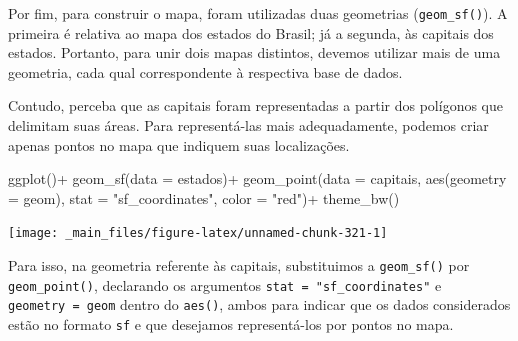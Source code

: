 \documentclass[
  brazilian,
]{book}
\newenvironment{Shaded}{\begin{snugshade}}{\end{snugshade}}
\newcommand{\AttributeTok}[1]{\textcolor[rgb]{0.77,0.63,0.00}{#1}}
\newcommand{\FunctionTok}[1]{\textcolor[rgb]{0.00,0.00,0.00}{#1}}
\newcommand{\NormalTok}[1]{#1}
\newcommand{\SpecialCharTok}[1]{\textcolor[rgb]{0.00,0.00,0.00}{#1}}
\newcommand{\StringTok}[1]{\textcolor[rgb]{0.31,0.60,0.02}{#1}}
\begin{document}
Por fim, para construir o mapa, foram utilizadas duas geometrias (\texttt{geom\_sf()}). A primeira é relativa ao mapa dos estados do Brasil; já a segunda, às capitais dos estados. Portanto, para unir dois mapas distintos, devemos utilizar mais de uma geometria, cada qual correspondente à respectiva base de dados.

Contudo, perceba que as capitais foram representadas a partir dos polígonos que delimitam suas áreas. Para representá-las mais adequadamente, podemos criar apenas pontos no mapa que indiquem suas localizações.

\begin{Shaded}
\begin{Highlighting}[]
\FunctionTok{ggplot}\NormalTok{()}\SpecialCharTok{+}
  \FunctionTok{geom\_sf}\NormalTok{(}\AttributeTok{data =}\NormalTok{ estados)}\SpecialCharTok{+}
  \FunctionTok{geom\_point}\NormalTok{(}\AttributeTok{data =}\NormalTok{ capitais,}
             \FunctionTok{aes}\NormalTok{(}\AttributeTok{geometry =}\NormalTok{ geom),}
             \AttributeTok{stat =} \StringTok{"sf\_coordinates"}\NormalTok{,}
             \AttributeTok{color =} \StringTok{"red"}\NormalTok{)}\SpecialCharTok{+}
  \FunctionTok{theme\_bw}\NormalTok{()}
\end{Highlighting}
\end{Shaded}

\begin{center}\texttt{[image: \_main\_files/figure-latex/unnamed-chunk-321-1]} \end{center}

Para isso, na geometria referente às capitais, substituimos a \texttt{geom\_sf()} por \texttt{geom\_point()}, declarando os argumentos \texttt{stat\ =\ "sf\_coordinates"} e \texttt{geometry\ =\ geom} dentro do \texttt{aes()}, ambos para indicar que os dados considerados estão no formato \texttt{sf} e que desejamos representá-los por pontos no mapa.
\end{document}
